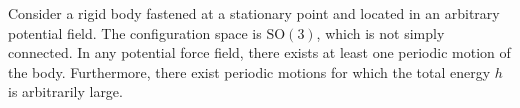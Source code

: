 Consider a rigid body fastened at a stationary point and located in an arbitrary potential field. The configuration space is $\mathrm{SO}(3)$, which is not simply connected. In any potential force field, there exists at least one periodic motion of the body. Furthermore, there exist periodic motions for which the total energy $h$ is arbitrarily large.

